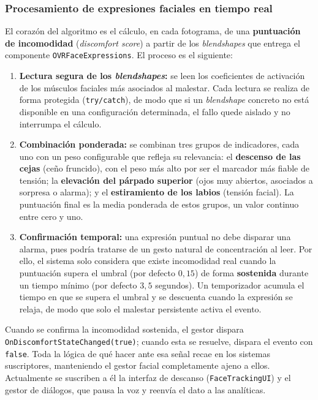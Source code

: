 \documentclass[12pt,twoside,titlepage]{report}
\begin{document}
\subsubsection{Procesamiento de expresiones faciales en tiempo real}

El corazón del algoritmo es el cálculo, en cada fotograma, de una \textbf{puntuación de incomodidad} (\textit{discomfort score}) a partir de los \textit{blendshapes} que entrega el componente \texttt{OVRFaceExpressions}.
El proceso es el siguiente:

\begin{enumerate}[label=\textbf{\arabic*.}, leftmargin=1.5cm, itemsep=0.5em]
  \item \textbf{Lectura segura de los \textit{blendshapes}:} se leen los coeficientes de activación de los músculos faciales más asociados al malestar.
Cada lectura se realiza de forma protegida (\texttt{try/catch}), de modo que si un \textit{blendshape} concreto no está disponible en una configuración determinada, el fallo quede aislado y no interrumpa el cálculo.
  \item \textbf{Combinación ponderada:} se combinan tres grupos de indicadores, cada uno con un peso configurable que refleja su relevancia: el \textbf{descenso de las cejas} (ceño fruncido), con el peso más alto por ser el marcador más fiable de tensión; la \textbf{elevación del párpado superior} (ojos muy abiertos, asociados a sorpresa o alarma); y el \textbf{estiramiento de los labios} (tensión facial).
La puntuación final es la media ponderada de estos grupos, un valor continuo entre cero y uno.
  \item \textbf{Confirmación temporal:} una expresión puntual no debe disparar una alarma, pues podría tratarse de un gesto natural de concentración al leer.
Por ello, el sistema solo considera que existe incomodidad real cuando la puntuación supera el umbral (por defecto $0{,}15$) de forma \textbf{sostenida} durante un tiempo mínimo (por defecto $3{,}5$ segundos).
Un temporizador acumula el tiempo en que se supera el umbral y se descuenta cuando la expresión se relaja, de modo que solo el malestar persistente activa el evento.
\end{enumerate}

Cuando se confirma la incomodidad sostenida, el gestor dispara \texttt{OnDiscomfort\hspace{0pt}StateChanged(true)}; cuando esta se resuelve, dispara el evento con \texttt{false}.
Toda la lógica de qué hacer ante esa señal recae en los sistemas suscriptores, manteniendo el gestor facial completamente ajeno a ellos.
Actualmente se suscriben a él la interfaz de descanso (\texttt{FaceTrackingUI}) y el gestor de diálogos, que pausa la voz y reenvía el dato a las analíticas.
\end{document}
